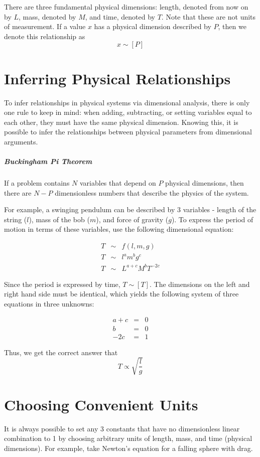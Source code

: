 \documentclass[11pt]{article}
\begin{document}
There are three fundamental physical dimensions: length, denoted from now on by $L$, mass, denoted by $M$, and time, denoted by $T$. Note that these are not units of measurement. If a value $x$ has a physical dimension described by $P$, then we denote this relationship as
\[ x \sim [P]\]

\section{Inferring Physical Relationships}

To infer relationships in physical systems via dimensional analysis, there is only one rule to keep in mind: when adding, subtracting, or setting variables equal to each other, they must have the same physical dimension. Knowing this, it is possible to infer the relationships between physical parameters from dimensional arguments.

\subparagraph{Buckingham Pi Theorem} If a problem contains $N$ variables that depend on $P$ physical dimensions, then there are $N - P$ dimensionless numbers that describe the physics of the system.

For example, a swinging pendulum can be described by 3 variables - length of the string ($l$), mass of the bob ($m$), and force of gravity ($g$). To express the period of motion in terms of these variables, use the following dimensional equation:

\begin{eqnarray}
	T & \sim & f(l, m, g)\\
	T & \sim & l^a m^b g^c\\
	T & \sim & L^{a+c} M^b T^{-2c}
\end{eqnarray}

Since the period is expressed by time, $T \sim [T]$. The dimensions on the left and right hand side must be identical, which yields the following system of three equations in three unknowns:

\begin{eqnarray}
	a + c & = & 0\\
	b & = & 0\\
	-2c & = & 1
\end{eqnarray}

Thus, we get the correct answer that
\begin{equation}
	T \propto \sqrt{\frac{l}{g}}
\end{equation}

\section{Choosing Convenient Units}
	It is always possible to set any 3 constants that have no dimensionless linear combination to 1 by choosing arbitrary units of length, mass, and time (physical dimensions). For example, take Newton's equation for a falling sphere with drag.
	
\end{document}
